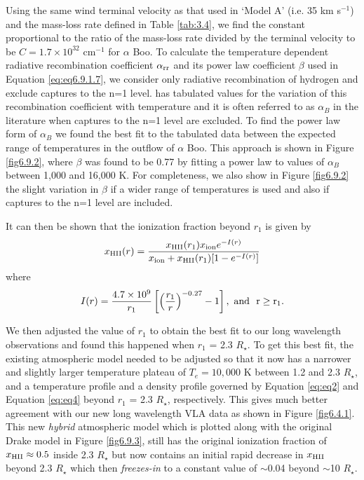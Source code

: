 Using the same wind terminal velocity as that used in `Model A' (i.e. 35 km s$^{-1}$) and the mass-loss rate defined in Table \ref{tab:3.4}, we find the constant proportional to the ratio of the mass-loss rate divided by the terminal velocity to be $C = 1.7 \times 10^{32} $ cm$^{-1}$ for $\alpha$ Boo. To calculate the temperature dependent radiative recombination coefficient $\alpha _{\rm{rr}}$ and its power law coefficient $\beta$ used in Equation \ref{eq:eq6.9.1.7}, we consider only radiative recombination of hydrogen and exclude captures to the n=1 level. \cite{spitzer_1978} has tabulated values for the variation of this recombination coefficient with temperature and it is often referred to as $\alpha _{B}$ in the literature when captures to the n=1 level are excluded. To find the power law form of $\alpha _{B}$ we found the best fit to the tabulated data between the expected range of temperatures in the outflow of $\alpha$ Boo. This approach is shown in Figure \ref{fig6.9.2}, where $\beta$ was found to be 0.77 by fitting a power law to values of $\alpha _{B}$ between 1,000 and 16,000 K. For completeness, we also show in Figure \ref{fig6.9.2} the slight variation in $\beta$ if a wider range of temperatures is used and also if captures to the n=1 level are included.

It can then be shown that the ionization fraction beyond $r_{1}$ is given by 
\begin{equation}
x_{\rm{HII}}(r)= \frac{x_{\rm{HII}}(r_1)x_{\rm{ion}}e^{-I(r)}}{x_{\rm{ion}}+x_{\rm{HII}}(r_1)[1 - e^{-I(r)}]}
\label{eq:eq4}
\end{equation}
where
\begin{equation}
I(r) = \frac{4.7\times 10^9}{r_{1}}\left[\left( \frac{r_{1}}{r}\right)^{-0.27} -1 \right], \ \rm{and} \ \  r \geq r_{1}.
\label{eq:eq5}
\end{equation}

We then adjusted the value of $r_{1}$ to obtain the best fit to our long wavelength observations and found this happened when $r_{1}$ = 2.3 $R_{\star}$. To get this best fit, the existing atmospheric model needed to be adjusted so that it now has a narrower and slightly larger temperature plateau of $T_e = 10,000$ K between 1.2 and 2.3 $R_{\star}$, and a temperature profile and a density profile governed by Equation \ref{eq:eq2} and Equation \ref{eq:eq4} beyond $r_{1}$ = 2.3 $R_{\star}$, respectively. This gives much better agreement with our new long wavelength VLA data as shown in Figure \ref{fig6.4.1}. This new \textit{hybrid} atmospheric model which is plotted along with the original Drake model in Figure \ref{fig6.9.3}, still has the original ionization fraction of $x_{\rm{HII}} \approx 0.5$ inside 2.3 $R_{\star}$ but now contains an initial rapid decrease in $x_{\rm{HII}}$ beyond 2.3 $R_{\star}$ which then \textit{freezes-in} to a constant value of $\sim$0.04 beyond $\sim$10 $R_{\star}$.

